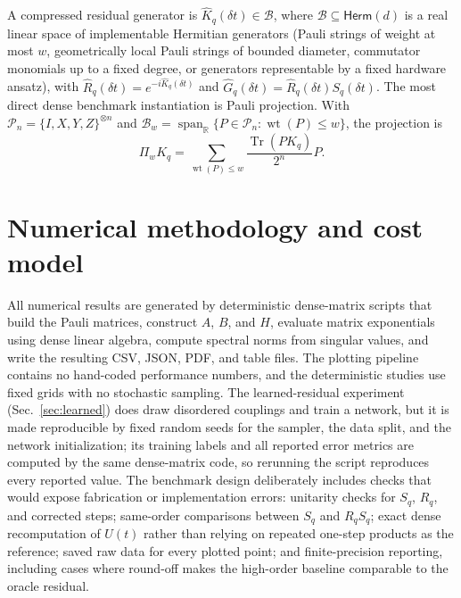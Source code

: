 \documentclass[aps,prresearch,reprint,superscriptaddress,nofootinbib,amsmath,amssymb]{revtex4-2}
\newcommand{\Tr}{\operatorname{Tr}}
\newcommand{\Span}{\operatorname{span}}
\newcommand{\cB}{\mathcal{B}}
\newcommand{\cP}{\mathcal{P}}
\newcommand{\dt}{\delta t}
\begin{document}
A compressed residual generator is $\widehat K_q(\dt)\in\cB$, where $\cB\subseteq\mathsf{Herm}(d)$ is a real linear space of implementable Hermitian generators (Pauli strings of weight at most $w$, geometrically local Pauli strings of bounded diameter, commutator monomials up to a fixed degree, or generators representable by a fixed hardware ansatz), with $\widehat R_q(\dt)=e^{-i\widehat K_q(\dt)}$ and $\widehat G_q(\dt)=\widehat R_q(\dt)S_q(\dt)$. The most direct dense benchmark instantiation is Pauli projection. With $\cP_n=\{I,X,Y,Z\}^{\otimes n}$ and $\cB_w=\Span_\mathbb{R}\{P\in\cP_n:\operatorname{wt}(P)\leq w\}$, the projection is
\begin{equation}
    \Pi_wK_q=\sum_{\operatorname{wt}(P)\leq w}\frac{\Tr(PK_q)}{2^n}P.
    \label{eq:pauli-proj}
\end{equation}

\section{Numerical methodology and cost model}
\label{app:numerics}

All numerical results are generated by deterministic dense-matrix scripts that build the Pauli matrices, construct $A$, $B$, and $H$, evaluate matrix exponentials using dense linear algebra, compute spectral norms from singular values, and write the resulting CSV, JSON, PDF, and table files. The plotting pipeline contains no hand-coded performance numbers, and the deterministic studies use fixed grids with no stochastic sampling. The learned-residual experiment (Sec.~\ref{sec:learned}) does draw disordered couplings and train a network, but it is made reproducible by fixed random seeds for the sampler, the data split, and the network initialization; its training labels and all reported error metrics are computed by the same dense-matrix code, so rerunning the script reproduces every reported value. The benchmark design deliberately includes checks that would expose fabrication or implementation errors: unitarity checks for $S_q$, $R_q$, and corrected steps; same-order comparisons between $S_q$ and $R_qS_q$; exact dense recomputation of $U(t)$ rather than relying on repeated one-step products as the reference; saved raw data for every plotted point; and finite-precision reporting, including cases where round-off makes the high-order baseline comparable to the oracle residual.
\end{document}
